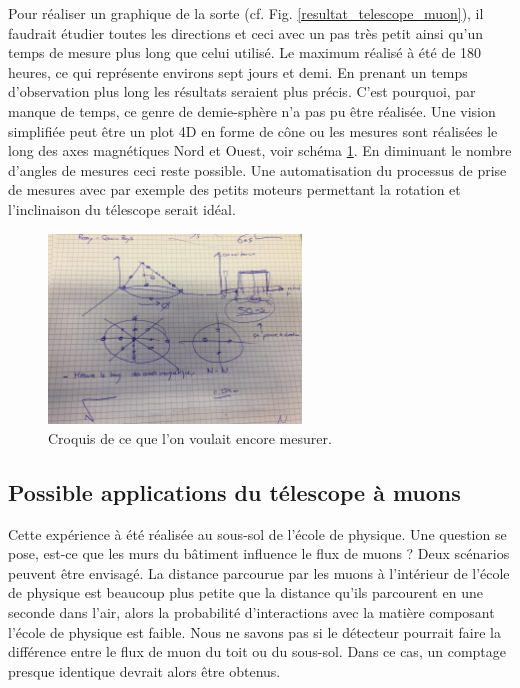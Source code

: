 \documentclass[12pt]{article}
\begin{document}
Pour réaliser un graphique de la sorte (cf. Fig. \ref{resultat_telescope_muon}), il faudrait étudier toutes les directions et ceci avec un pas très petit ainsi qu'un temps de mesure plus long que celui utilisé. Le maximum réalisé à été de 180 heures, ce qui représente environs sept jours et demi. En prenant un temps d'observation plus long les résultats seraient plus précis. C'est pourquoi, par manque de temps, ce genre de demie-sphère n'a pas pu être réalisée. Une vision simplifiée peut être un plot 4D en forme de cône ou les mesures sont réalisées le long des axes magnétiques Nord et Ouest, voir schéma \ref{fig:cone}. En diminuant le nombre d'angles de mesures ceci reste possible. Une automatisation du processus de prise de mesures avec par exemple des petits moteurs permettant la rotation et l'inclinaison du télescope serait idéal.

\begin{figure}[htpb!]
    \centering
    \includegraphics[width=0.6\textwidth]{Images/Schemas/Cone.jpeg}
    \captionsetup{width=0.7\textwidth}
    \caption{Croquis de ce que l'on voulait encore mesurer.}
    \label{fig:cone}
\end{figure}


\subsection{Possible applications du télescope à muons}

Cette expérience à été réalisée au sous-sol de l'école de physique. Une question se pose, est-ce que les murs du bâtiment influence le flux de muons ? Deux scénarios peuvent être envisagé. La distance parcourue par les muons à l'intérieur de l'école de physique est beaucoup plus petite que la distance qu'ils parcourent en une seconde dans l'air, alors la probabilité d'interactions avec la matière composant l'école de physique est faible. Nous ne savons pas si le détecteur pourrait faire la différence entre le flux de muon du toit ou du sous-sol. Dans ce cas, un comptage presque identique devrait alors être obtenus.
\end{document}
